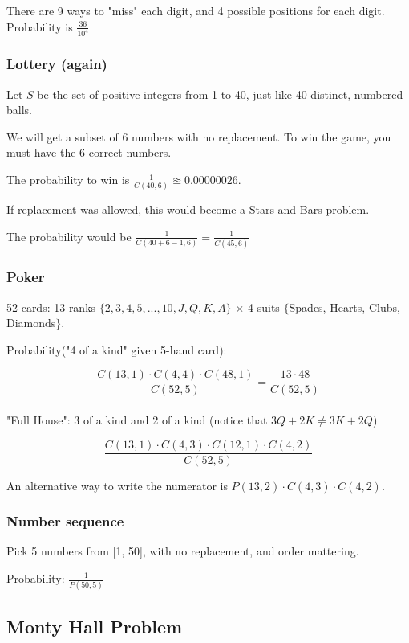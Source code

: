 \documentclass[english,openany]{book}
\begin{document}
    There are 9 ways to "miss" each digit, and 4 possible positions for each digit. Probability is $\frac{36}{10^4}$\\

    \subsubsection{Lottery (again)}

    Let $S$ be the set of positive integers from 1 to 40, just like 40 distinct, numbered balls.

    We will get a subset of 6 numbers with no replacement. To win the game, you must have the 6 correct numbers.

    The probability to win is $\frac{1}{C(40,6)} \approxeq 0.00000026$.

    If replacement was allowed, this would become a Stars and Bars problem.

    The probability would be $\frac{1}{C(40+6-1, 6)} = \frac{1}{C(45,6)}$\\

    \subsubsection{Poker}

    52 cards: 13 ranks $\{2,3,4,5,...,10,J,Q,K,A\}$ $\times$ 4 suits $\{$Spades, Hearts, Clubs, Diamonds$\}$.

    Probability("4 of a kind" given 5-hand card):

    $$\frac{C(13,1) \cdot C(4,4) \cdot C(48,1)}{C(52,5)} = \frac{13 \cdot 48}{C(52,5)}$$\\

    "Full House": 3 of a kind and 2 of a kind (notice that $3Q + 2K \neq 3K + 2Q$)

    $$\frac{C(13,1) \cdot C(4,3) \cdot C(12,1) \cdot C(4,2)}{C(52,5)}$$

    An alternative way to write the numerator is $P(13,2) \cdot C(4,3) \cdot C(4,2)$.\\

    \subsubsection{Number sequence}

    Pick 5 numbers from [1, 50], with no replacement, and order mattering.

    Probability: $\frac{1}{P(50,5)}$

    \subsection{Monty Hall Problem}
\end{document}

